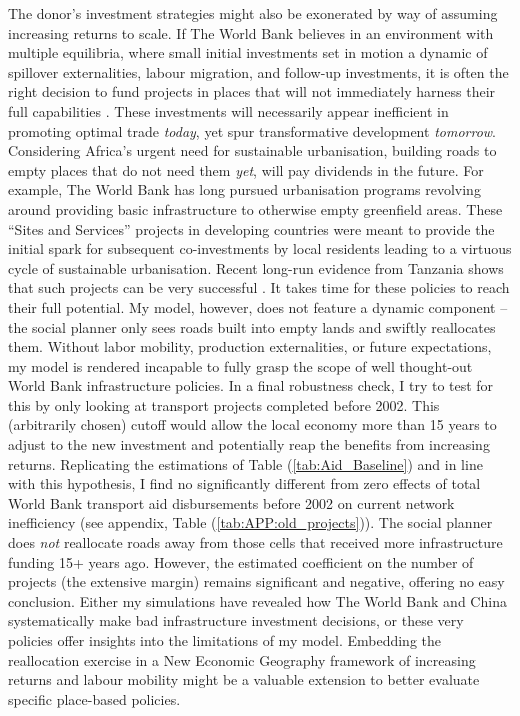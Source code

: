\documentclass[11pt, oneside]{article}   	%
\let\oldref\ref
\renewcommand{\ref}[1]{(\oldref{#1})}
\begin{document}
The donor's investment strategies might also be exonerated by way of assuming increasing returns to scale. If The World Bank believes in an environment with multiple equilibria, where small initial investments set in motion a dynamic of spillover externalities, labour migration, and follow-up investments, it is often the right decision to fund projects in places that will not immediately harness their full capabilities \citep{krugman_history_1991,krugman_increasing_1991,Krugman_UrbanConcentrationRole_1996,Fujita_spatialeconomycities_1999,Duranton_PlaceBasedPoliciesDevelopment_2017}. These investments will necessarily appear inefficient in promoting optimal trade \emph{today}, yet spur transformative development \emph{tomorrow}. Considering Africa's urgent need for sustainable urbanisation, building roads to empty places that do not need them \emph{yet}, will pay dividends in the future. For example, The World Bank has long pursued urbanisation programs revolving around providing basic infrastructure to otherwise empty greenfield areas. These ``Sites and Services'' projects in developing countries were meant to provide the initial spark for subsequent co-investments by local residents leading to a virtuous cycle of sustainable urbanisation. Recent long-run evidence from Tanzania shows that such projects can be very successful \citep{Michaels_PlanningAheadBetter_2018}. It takes time for these policies to reach their full potential. My model, however, does not feature a dynamic component -- the social planner only sees roads built into empty lands and swiftly reallocates them. Without labor mobility, production externalities, or future expectations, my model is rendered incapable to fully grasp the scope of well thought-out World Bank infrastructure policies. In a final robustness check, I try to test for this by only looking at transport projects completed before 2002. This (arbitrarily chosen) cutoff would allow the local economy more than 15 years to adjust to the new investment and potentially reap the benefits from increasing returns. Replicating the estimations of Table \ref{tab:Aid_Baseline} and in line with this hypothesis, I find no significantly different from zero effects of total World Bank transport aid disbursements before 2002 on current network inefficiency (see appendix, Table \ref{tab:APP:old_projects}). The social planner does \emph{not} reallocate roads away from those cells that received more infrastructure funding 15+ years ago. However, the estimated coefficient on the number of projects (the extensive margin) remains significant and negative, offering no easy conclusion. Either my simulations have revealed how The World Bank and China systematically make bad infrastructure investment decisions, or these very policies offer insights into the limitations of my model. Embedding the reallocation exercise in a New Economic Geography framework of increasing returns and labour mobility might be a valuable extension to better evaluate specific place-based policies.
\end{document}
